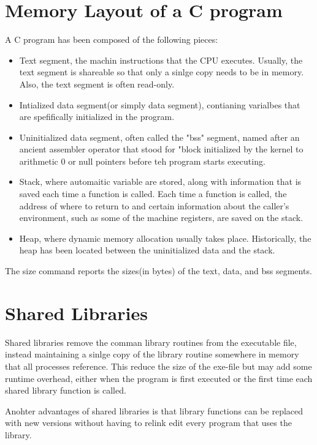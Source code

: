 \documentclass[a4paper,10pt]{book}
\begin{document}
\section{Memory Layout of a C program}
A C program has been composed of the following pieces:
\begin{itemize}
\item Text segment, the machin instructions that the CPU executes. Usually, the
text segment is shareable so that only a sinlge copy needs to be in memory.
Also, the text segment is often read-only.
\item Intialized data segment(or simply data segment), contianing varialbes that
are spefifically initialized in the program.
\item Uninitialized data segment, often called the "bss" segment, named after an
ancient assembler operator that stood for "block initialized by the kernel to
arithmetic 0 or null pointers before teh program starts executing.
\item Stack, where automaitic variable are stored, along with information that
is saved each time a function is called. Each time a function is called, the
address of where to return to and certain information about the caller's
environment, such as some of the machine registers, are saved on the stack. 
\item Heap, where dynamic memory allocation usually takes place. Historically,
the heap has been located between the uninitialized data and the stack.
\end{itemize}
The size command reports the sizes(in bytes) of the text, data, and bss
segments.
\section{Shared Libraries}
Shared libraries remove the comman library routines from the executable file,
instead maintaining a sinlge copy of the library routine somewhere in memory
that all processes reference. This reduce the size of the exe-file but may add
some runtime overhead, either when the program is first executed or the first
time each shared library function is called.

Anohter advantages of shared libraries is that library functions can be replaced
with new versions without having to relink edit every program that uses the
library. 
\end{document}
